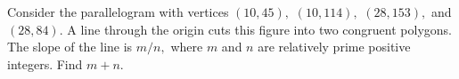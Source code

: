 Consider the parallelogram with vertices $(10,45),$ $(10,114),$ $(28,153),$ and $(28,84).$  A line through the origin cuts this figure into two congruent polygons.  The slope of the line is $m/n,$ where $m$ and $n$ are relatively prime positive integers.  Find $m+n.$